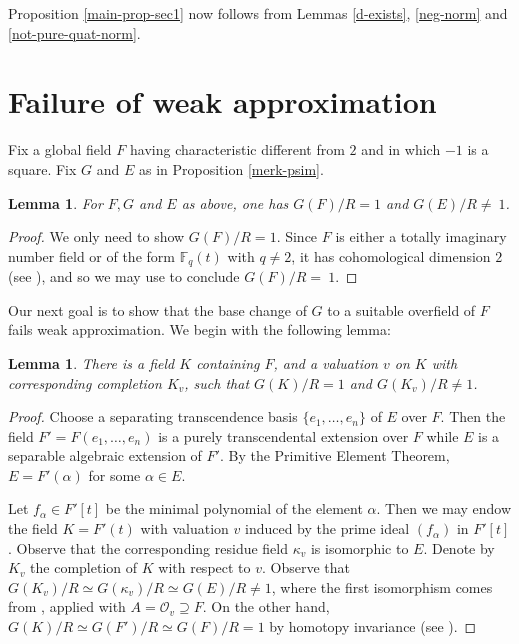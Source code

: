 \documentclass[11pt,letterpaper]{amsart}
\theoremstyle{plain}
\newtheorem{lemma}[theorem]{Lemma}
\theoremstyle{definition}
\theoremstyle{remark}
\begin{document}
Proposition \ref{main-prop-sec1} now follows from Lemmas \ref{d-exists}, \ref{neg-norm} and \ref{not-pure-quat-norm}.

\section{Failure of weak approximation}
Fix a global field $F$ having characteristic different from $2$ and in which $-1$ is a square. Fix $G$ and $E$ as in Proposition \ref{merk-psim}.

\begin{lemma}\label{efg}
        For $F,G$ and $E$ as above, one has $G(F)/R = 1$ and $G(E)/R\neq~ 1$.
    \end{lemma}
    \begin{proof}
         We only need to show $G(F)/R = 1$. Since $F$ is either a totally imaginary number field or of the form $\mathbb{F}_q(t)$ with $q\neq 2$, it has cohomological dimension $2$ (see \cite[Proposition 8.3.17, Theorem 10.1.11]{MR1737196}), and so we may use \cite[Theorem 3.7]{kulshrestha2008} to conclude $G(F)/R=~1$.
    \end{proof}

Our next goal is to show that the base change of $G$ to a suitable overfield of $F$ fails weak approximation. We begin with the following lemma:
    
    \begin{lemma}\label{val-fld}
        There is a field $K$ containing $F$, and a valuation $v$ on $K$ with corresponding completion $K_v$, such that $G(K)/R = 1$ and $G(K_v)/R\neq 1$.
    \end{lemma}
    \begin{proof}
        Choose a separating transcendence basis $\{e_1,\ldots,e_n\}$ of $E$ over $F$. Then the field $F' = F(e_1,\ldots,e_n)$ is a purely transcendental extension over $F$ while $E$ is a separable algebraic extension of $F'$.
        By the Primitive Element Theorem, $E = F'(\alpha)$ for some $\alpha\in E$.

        Let $f_\alpha\in F'[t]$ be the minimal polynomial of the element $\alpha$. Then we may endow the field $K = F'(t)$ with valuation $v$ induced by the prime ideal $(f_\alpha)$ in $F'[t]$. Observe that the corresponding residue field $\kappa_v$ is isomorphic to $E$. Denote by $K_v$ the completion of $K$ with respect to $v$. Observe that $G(K_v)/R\simeq G(\kappa_v)/R\simeq G(E)/R\neq 1$, where the first isomorphism comes from \cite[Theorem 8.14]{gille2025r}, applied with $A = \mathcal{O}_v\supseteq F$. On the other hand, $G(K)/R\simeq G(F')/R\simeq G(F)/R = 1$ by homotopy invariance (see \cite[p.1]{gille2010lectures}).
    \end{proof}
\end{document}
